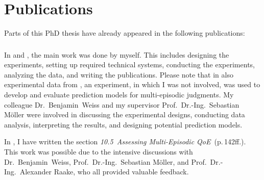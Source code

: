 \chapter*{Publications}
Parts of this PhD thesis have already appeared in the following publications:

\begin{refsection}
    \small
    \nocite{guse_macro-temporal_2013}
    \nocite{guse_modelling_2014}
    \nocite{weiss_temporal_2014}
    \printbibliography[heading=none]
\end{refsection}

\subsection*{}
In \citet{guse_macro-temporal_2013} and \citet{guse_modelling_2014}, the main work was done by myself.
This includes designing the experiments, setting up required technical systems, conducting the experiments, analyzing the data, and writing the publications.
Please note that in \citet{guse_modelling_2014} also experimental data from \citet{moller_single-call_2011}, an experiment, in which I was not involved, was used to develop and evaluate prediction models for multi-episodic judgments.
My colleague Dr.~Benjamin~Weiss and my supervisor Prof.~Dr.-Ing.~Sebastian Möller were involved in discussing the experimental designs, conducting data analysis, interpreting the results, and designing potential prediction models.

In \citet{weiss_temporal_2014}, I have written the section \emph{10.5~Assessing Multi-Episodic QoE}~(p.\,142ff.).
This work was possible due to the intensive discussions with Dr.~Benjamin~Weiss, Prof.~Dr.-Ing.~Sebastian Möller, and Prof.~Dr.-Ing.~Alexander Raake, who all provided valuable feedback.